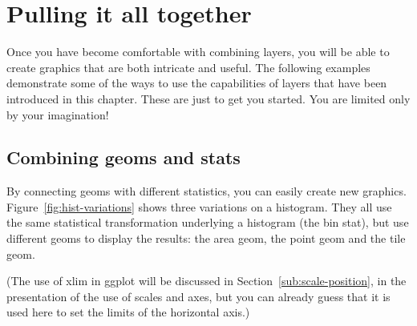 \section{Pulling it all together}
\label{sec:pull-together}

Once you have become comfortable with combining layers, you will be able to create graphics that are both intricate and useful.  The following examples demonstrate some of the ways to use the capabilities of layers that have been introduced in this chapter.  These are just to get you started. You are limited only by your imagination!

\subsection{Combining geoms and stats}
\label{sub:new_plot_types}

By connecting geoms with different statistics, you can easily create new graphics.  Figure~\ref{fig:hist-variations} shows three variations on a histogram.  They all use the same statistical transformation underlying a histogram (the bin stat), but use different geoms to display the results: the area geom, the point geom and the tile geom.  

% 



(The use of xlim in ggplot will be discussed in Section~\ref{sub:scale-position}, in the presentation of the use of scales and axes, but you can already guess that it is used here to set the limits of the horizontal axis.)

% 


